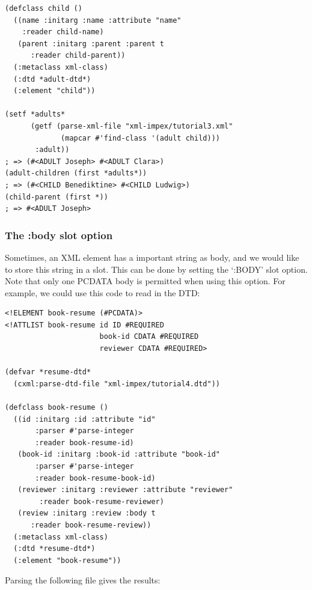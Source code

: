 \begin{Verbatim}[fontsize=\small,frame=leftline,framerule=0.9mm,rulecolor=\color{gray},framesep=5.1mm,xleftmargin=5mm,fontfamily=cmtt]
(defclass child ()
  ((name :initarg :name :attribute "name"
    :reader child-name)
   (parent :initarg :parent :parent t
      :reader child-parent))
  (:metaclass xml-class)
  (:dtd *adult-dtd*)
  (:element "child"))

(setf *adults* 
      (getf (parse-xml-file "xml-impex/tutorial3.xml"
             (mapcar #'find-class '(adult child)))
       :adult))
; => (#<ADULT Joseph> #<ADULT Clara>)
(adult-children (first *adults*))
; => (#<CHILD Benediktine> #<CHILD Ludwig>)
(child-parent (first *))
; => #<ADULT Joseph>
\end{Verbatim}


\subsubsection{ The :body slot option}

Sometimes, an XML element has a important string as body, and we
would like to store this string in a slot. This can be done by
setting the `:BODY' slot option. Note that only one PCDATA body is
permitted when using this option. For example, we could use this
code to read in the DTD:

\begin{Verbatim}[fontsize=\small,frame=leftline,framerule=0.9mm,rulecolor=\color{gray},framesep=5.1mm,xleftmargin=5mm,fontfamily=cmtt]
<!ELEMENT book-resume (#PCDATA)>
<!ATTLIST book-resume id ID #REQUIRED
                      book-id CDATA #REQUIRED
                      reviewer CDATA #REQUIRED>

(defvar *resume-dtd*
  (cxml:parse-dtd-file "xml-impex/tutorial4.dtd"))

(defclass book-resume ()
  ((id :initarg :id :attribute "id"
       :parser #'parse-integer
       :reader book-resume-id)
   (book-id :initarg :book-id :attribute "book-id"
       :parser #'parse-integer
       :reader book-resume-book-id)
   (reviewer :initarg :reviewer :attribute "reviewer"
        :reader book-resume-reviewer)
   (review :initarg :review :body t
      :reader book-resume-review))
  (:metaclass xml-class)
  (:dtd *resume-dtd*)
  (:element "book-resume"))
\end{Verbatim}
Parsing the following file gives the results:

